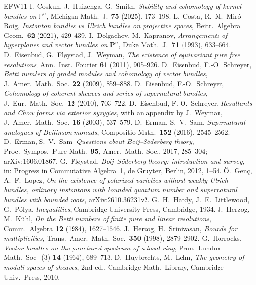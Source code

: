 \documentclass[11pt]{amsart}
\theoremstyle{definition}
\theoremstyle{remark}
\begin{document}
\begin{thebibliography}{EFW11}
 I.~Coskun, J.~Huizenga, G.~Smith, \emph{Stability and cohomology of kernel bundles on $\mathbb P^n$}, Michigan Math.\ J.\ \textbf{75} (2025), 173--198.
 L.~Costa, R.~M.~Miró-Roig, \emph{Instanton bundles vs Ulrich bundles on projective spaces}, Beitr.\ Algebra Geom.\ \textbf{62} (2021), 429--439.
 I.~Dolgachev, M.~Kapranov, \emph{Arrangements of hyperplanes and vector bundles on $\mathbf P^n$}, Duke Math.\ J.\ \textbf{71} (1993), 633--664.
 D.~Eisenbud, G.~Fløystad, J.~Weyman, \emph{The existence of equivariant pure free resolutions}, Ann.\ Inst.\ Fourier \textbf{61} (2011), 905--926.
 D.~Eisenbud, F.-O.~Schreyer, \emph{Betti numbers of graded modules and cohomology of vector bundles}, J.\ Amer.\ Math.\ Soc.\ \textbf{22} (2009), 859--888.
 D.~Eisenbud, F.-O.~Schreyer, \emph{Cohomology of coherent sheaves and series of supernatural bundles}, J.\ Eur.\ Math.\ Soc.\ \textbf{12} (2010), 703--722.
 D.~Eisenbud, F.-O.~Schreyer, \emph{Resultants and Chow forms via exterior syzygies}, with an appendix by J.~Weyman, J.\ Amer.\ Math.\ Soc.\ \textbf{16} (2003), 537--579.
 D.~Erman, S.~V.~Sam, \emph{Supernatural analogues of Beilinson monads}, Compositio Math.\ \textbf{152} (2016), 2545--2562.
 D.~Erman, S.~V.~Sam, \emph{Questions about Boij--Söderberg theory}, Proc.\ Sympos.\ Pure Math.~\textbf{95}, Amer.\ Math.\ Soc., 2017, 285--304; arXiv:1606.01867.
 G.~Fløystad, \emph{Boij--Söderberg theory: introduction and survey}, in: Progress in Commutative Algebra~1, de Gruyter, Berlin, 2012, 1--54.
 Ö.~Genç, A.~F.~Lopez, \emph{On the existence of polarized varieties without weakly Ulrich bundles, ordinary instantons with bounded quantum number and supernatural bundles with bounded roots}, arXiv:2610.36231v2.
 G.~H.~Hardy, J.~E.~Littlewood, G.~P\'olya, \emph{Inequalities}, Cambridge University Press, Cambridge, 1934.
 J.~Herzog, M.~Kühl, \emph{On the Betti numbers of finite pure and linear resolutions}, Comm.\ Algebra \textbf{12} (1984), 1627--1646.
 J.~Herzog, H.~Srinivasan, \emph{Bounds for multiplicities}, Trans.\ Amer.\ Math.\ Soc.\ \textbf{350} (1998), 2879--2902.
 G.~Horrocks, \emph{Vector bundles on the punctured spectrum of a local ring}, Proc.\ London Math.\ Soc.\ (3) \textbf{14} (1964), 689--713.
 D.~Huybrechts, M.~Lehn, \emph{The geometry of moduli spaces of sheaves}, 2nd ed., Cambridge Math.\ Library, Cambridge Univ.\ Press, 2010.

\end{thebibliography}
\end{document}

